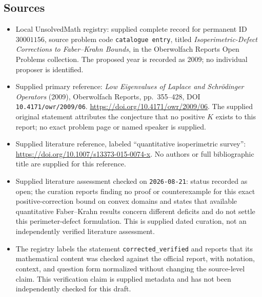 \documentclass[11pt]{article}
\begin{document}
\subsection{Sources}
\begin{itemize}
\item Local UnsolvedMath registry: supplied complete record for permanent ID \(30001156\), source problem code \texttt{catalogue entry}, titled \emph{Isoperimetric-Defect Corrections to Faber--Krahn Bounds}, in the Oberwolfach Reports Open Problems collection. The proposed year is recorded as 2009; no individual proposer is identified.
\item Supplied primary reference: \emph{Low Eigenvalues of Laplace and Schr\"odinger Operators} (2009), Oberwolfach Reports, pp.\ 355--428, DOI \texttt{10.4171/owr/2009/06}. \url{https://doi.org/10.4171/owr/2009/06}. The supplied original statement attributes the conjecture that no positive \(K\) exists to this report; no exact problem page or named speaker is supplied.
\item Supplied literature reference, labeled ``quantitative isoperimetric survey'': \url{https://doi.org/10.1007/s13373-015-0074-x}. No authors or full bibliographic title are supplied for this reference.
\item Supplied literature assessment checked on \texttt{2026-08-21}: status recorded as open; the curation reports finding no proof or counterexample for this exact positive-correction bound on convex domains and states that available quantitative Faber--Krahn results concern different deficits and do not settle this perimeter-defect formulation. This is supplied dated curation, not an independently verified literature assessment.
\item The registry labels the statement \texttt{corrected\_verified} and reports that its mathematical content was checked against the official report, with notation, context, and question form normalized without changing the source-level claim. This verification claim is supplied metadata and has not been independently checked for this draft.
\end{itemize}
\end{document}
